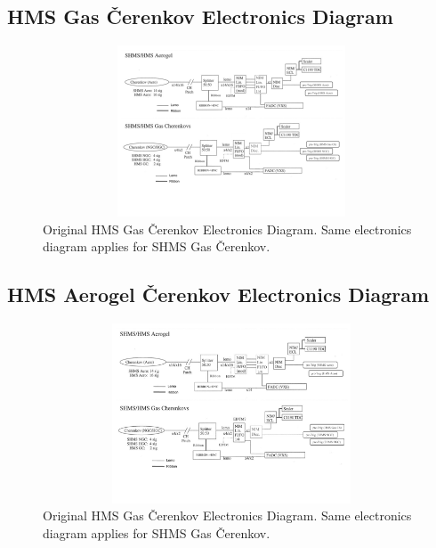 \documentclass[11pt]{article}
\begin{document}
\begin{appendices}
\subsection{HMS Gas \v{C}erenkov Electronics Diagram}
\label{appendix:Appx3}
\begin{figure}[h!]
  \centering
  \includegraphics[width=7.0in, height=2.0in]{../HMS_Cer_trig.pdf}
  \caption{Original HMS Gas \v{C}erenkov Electronics Diagram. Same electronics diagram applies for SHMS Gas \v{C}erenkov.}
  \label{fig:hms_gas_cer_trg}
\end{figure}

\subsection{HMS Aerogel \v{C}erenkov Electronics Diagram}
\label{appendix:Appx4}
\begin{figure}[h!]
  \centering
  \includegraphics[width=6.5in, height=2.1in]{../HMS_Aero_trig.pdf}
  \caption{Original HMS Gas \v{C}erenkov Electronics Diagram. Same electronics diagram applies for SHMS Gas \v{C}erenkov.}
  \label{fig:hms_gas_cer_trg}
\end{figure}
\newpage

\end{appendices}
\end{document}
